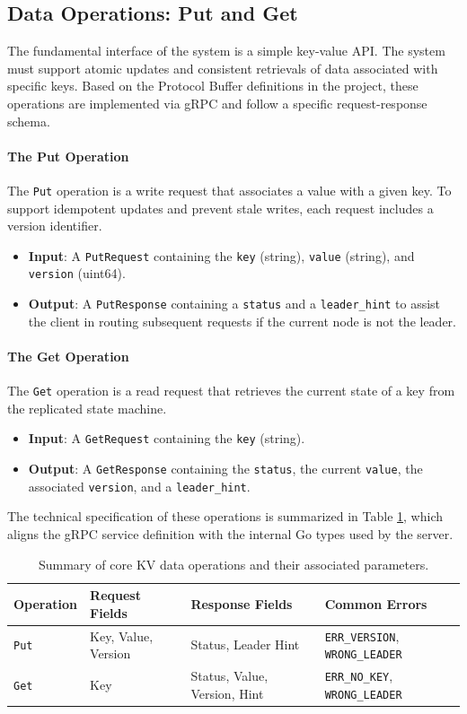\subsection{Data Operations: Put and Get}
The fundamental interface of the system is a simple key-value API. The system must support atomic updates and consistent retrievals of data associated with specific keys. Based on the Protocol Buffer definitions in the project, these operations are implemented via gRPC and follow a specific request-response schema.

\paragraph{The Put Operation}
The \texttt{Put} operation is a write request that associates a value with a given key. To support idempotent updates and prevent stale writes, each request includes a version identifier.
\begin{itemize}
    \item \textbf{Input}: A \texttt{PutRequest} containing the \texttt{key} (string), \texttt{value} (string), and \texttt{version} (uint64).
    \item \textbf{Output}: A \texttt{PutResponse} containing a \texttt{status} and a \texttt{leader\_hint} to assist the client in routing subsequent requests if the current node is not the leader.
\end{itemize}

\paragraph{The Get Operation}
The \texttt{Get} operation is a read request that retrieves the current state of a key from the replicated state machine.
\begin{itemize}
    \item \textbf{Input}: A \texttt{GetRequest} containing the \texttt{key} (string).
    \item \textbf{Output}: A \texttt{GetResponse} containing the \texttt{status}, the current \texttt{value}, the associated \texttt{version}, and a \texttt{leader\_hint}.
\end{itemize}

The technical specification of these operations is summarized in Table \ref{tab:kv_api_summary}, which aligns the gRPC service definition with the internal Go types used by the server.

\begin{table}[h]
\centering
\caption{Summary of core KV data operations and their associated parameters.}
\label{tab:kv_api_summary}
\begin{tabularx}{\textwidth}{|l|X|X|l|}
\hline
\textbf{Operation} & \textbf{Request Fields} & \textbf{Response Fields} & \textbf{Common Errors} \\ \hline
\texttt{Put} & Key, Value, Version & Status, Leader Hint & \texttt{ERR\_VERSION}, \texttt{WRONG\_LEADER} \\ \hline
\texttt{Get} & Key & Status, Value, Version, Hint & \texttt{ERR\_NO\_KEY}, \texttt{WRONG\_LEADER} \\ \hline
\end{tabularx}
\end{table}


